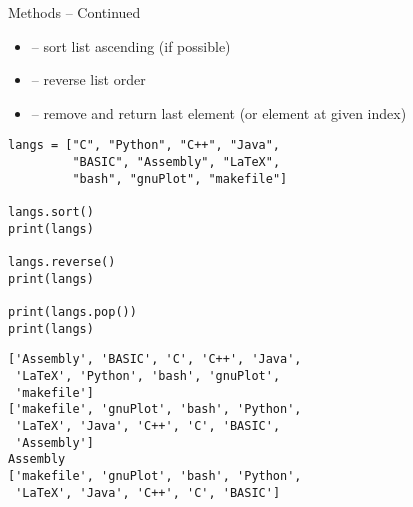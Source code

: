\begin{frame}[fragile]
%
\begin{Large}
Methods -- Continued
\vspace{6pt}
\end{Large}
\begin{itemize}
\item {} -- sort list ascending (if possible)
\item {} -- reverse list order
\item {} -- remove and return last element (or element at given index)
\end{itemize}
%
\begin{tcbraster}[raster columns=2,
                  raster equal height,
                  nobeforeafter,
                  raster column skip=0.5cm]
\begin{codebox}
\begin{verbatim}
langs = ["C", "Python", "C++", "Java",
         "BASIC", "Assembly", "LaTeX",
         "bash", "gnuPlot", "makefile"]

langs.sort()
print(langs)

langs.reverse()
print(langs)

print(langs.pop())
print(langs)
\end{verbatim}
\end{codebox}
%
\begin{cmdbox}
\begin{verbatim}
['Assembly', 'BASIC', 'C', 'C++', 'Java', 
 'LaTeX', 'Python', 'bash', 'gnuPlot', 
 'makefile']
['makefile', 'gnuPlot', 'bash', 'Python',
 'LaTeX', 'Java', 'C++', 'C', 'BASIC',
 'Assembly']
Assembly
['makefile', 'gnuPlot', 'bash', 'Python',
 'LaTeX', 'Java', 'C++', 'C', 'BASIC']

\end{verbatim}
\end{cmdbox}
\end{tcbraster}
%
\end{frame}